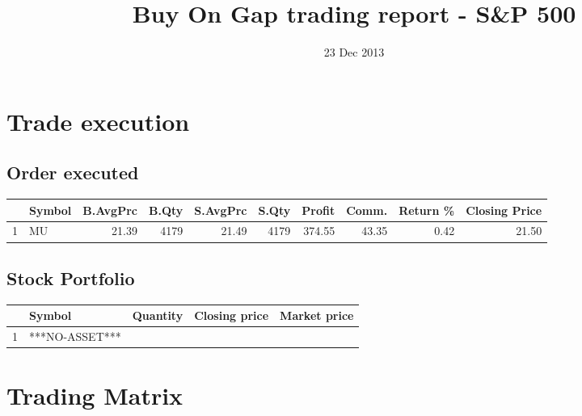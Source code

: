 \documentclass{tufte-handout}\usepackage[]{graphicx}\usepackage[]{color}
\title{Buy On Gap trading report - S\&P 500}
\date{ 23 Dec 2013 }
\begin{document}
\maketitle


\section{Trade execution}
\subsection{Order executed}

\begin{table}[ht]
\centering
\begin{tabular}{llrrrrrrr|r}
  \hline
 & Symbol & B.AvgPrc & B.Qty & S.AvgPrc & S.Qty & Profit & Comm. & Return \% & Closing Price \\ 
  \hline
1 & MU & 21.39 & 4179 & 21.49 & 4179 & 374.55 & 43.35 & 0.42 & 21.50 \\ 
   \hline
\end{tabular}
\end{table}



\subsection{Stock Portfolio}
\begin{table}[ht]
\centering
\begin{tabular}{llrrr}
  \hline
 & Symbol & Quantity & Closing price & Market price \\ 
  \hline
1 & ***NO-ASSET*** &  &  &  \\ 
   \hline
\end{tabular}
\end{table}



\section{Trading Matrix}
\end{document}
